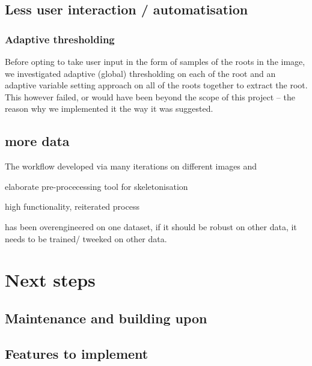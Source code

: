 \subsection{Less user interaction / automatisation}

\subsubsection{Adaptive thresholding}
Before opting to take user input in the form of samples of the roots in the image, we investigated adaptive (global) thresholding on each of the root and an adaptive variable setting approach on all of the roots together to extract the root. This however failed, or would have been beyond the scope of this project -- the reason why we implemented it the way it was suggested.



\subsection{more data}


The workflow developed via  many iterations on different images and 

elaborate pre-procecessing tool for skeletonisation

high functionality, reiterated process

has been overengineered on one dataset, if it should be robust on other data, it needs to be trained/ tweeked on other data.




\section{Next steps}

\subsection{Maintenance and building upon}

\subsection{Features to implement}

